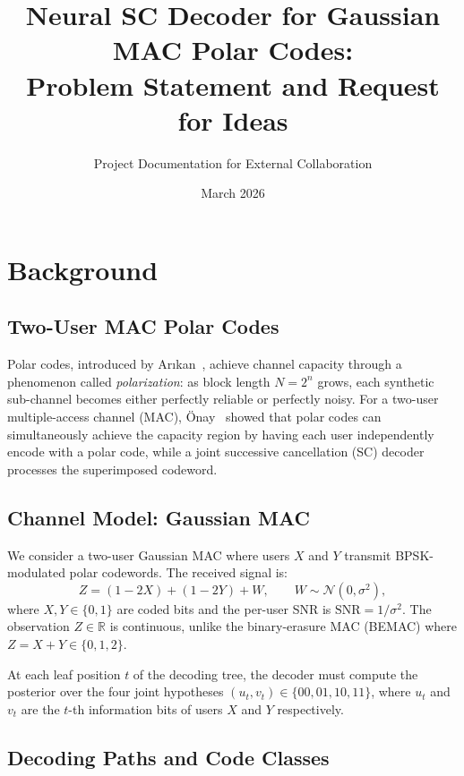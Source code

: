 \documentclass[10pt]{article}
\title{\textbf{Neural SC Decoder for Gaussian MAC Polar Codes:\\Problem Statement and Request for Ideas}}
\author{Project Documentation for External Collaboration}
\date{March 2026}
\begin{document}
\maketitle

\section{Background}

\subsection{Two-User MAC Polar Codes}

Polar codes, introduced by Ar{\i}kan~\cite{arikan2009}, achieve channel capacity through a phenomenon called \emph{polarization}: as block length $N = 2^n$ grows, each synthetic sub-channel becomes either perfectly reliable or perfectly noisy. For a two-user multiple-access channel (MAC), \"Onay~\cite{onay2013} showed that polar codes can simultaneously achieve the capacity region by having each user independently encode with a polar code, while a joint successive cancellation (SC) decoder processes the superimposed codeword.

\subsection{Channel Model: Gaussian MAC}

We consider a two-user Gaussian MAC where users $X$ and $Y$ transmit BPSK-modulated polar codewords. The received signal is:
\begin{equation}
Z = (1 - 2X) + (1 - 2Y) + W, \qquad W \sim \mathcal{N}(0, \sigma^2),
\label{eq:gmac}
\end{equation}
where $X, Y \in \{0, 1\}$ are coded bits and the per-user SNR is $\text{SNR} = 1/\sigma^2$. The observation $Z \in \mathbb{R}$ is continuous, unlike the binary-erasure MAC (BEMAC) where $Z = X + Y \in \{0, 1, 2\}$.

At each leaf position $t$ of the decoding tree, the decoder must compute the posterior over the four joint hypotheses $(u_t, v_t) \in \{00, 01, 10, 11\}$, where $u_t$ and $v_t$ are the $t$-th information bits of users $X$ and $Y$ respectively.

\subsection{Decoding Paths and Code Classes}
\end{document}
